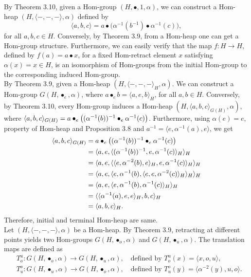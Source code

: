 \documentclass[14pt]{article}
\theoremstyle{Definition}
\theoremstyle{remark}
\begin{document}
By Theorem 3.10, given a Hom-group $(H, \bullet, 1, \alpha)$, we can construct a Hom-heap $(H, \langle -,-,- \rangle, \alpha)$ defined by
\[
\langle a,b,c\rangle = a \bullet \big(\alpha^{-1}(b^{-1}) \bullet \alpha^{-1}(c)\big),
\]
for all $a,b,c \in H$.
Conversely, by Theorem 3.9, from a Hom-heap one can get a Hom-group structure.
Furthermore, we can easily verify that the map $f : H \to H$, defined by $f(a) = a \bullet x$, for a fixed Hom-retract element $x$ satisfying $\alpha(x)=x \in H$, is an isomorphism of Hom-groups from the initial Hom-group to the corresponding induced Hom-group.\\
By Theorem 3.9, given a Hom-heap $(H,\langle-,-,-\rangle_{H},\alpha)$. We can construct a Hom-group $G(H,\bullet_{e},\alpha)$, where $a\bullet_{e}b=\langle a,e,b\rangle_{H}$, for all $a,b\in H$. Conversely, by Theorem 3.10, every Hom-group induces a Hom-heap $(H,\langle a,b,c\rangle_{G(H)},\alpha)$, where $\langle a,b,c\rangle_{G(H)}=a\bullet_{e}\big{(}(\alpha^{-1}(b))^{-1}\bullet_{e}\alpha^{-1}(c)\big{)}$. Furthermore, using $\alpha(e)=e$, property of Hom-heap and Proposition 3.8 and $a^{-1}=\langle e,\alpha^{-1}(a), e\rangle$, we get
\begin{align*}
\langle a,b,c\rangle_{G(H)}&=a\bullet_{e}\big{(}(\alpha^{-1}(b))^{-1}\bullet_{e}\alpha^{-1}(c)\big{)}\\
&=\langle a,e,\langle(\alpha^{-1}(b))^{-1},e,\alpha^{-1}(c)\rangle_{H}\rangle_{H}\\
&=\langle a,e,\langle\langle e,\alpha^{-2}(b),e\rangle_{H},e,\alpha^{-1}(c)\rangle_{H}\rangle_{H}\\
&=\langle a,e,\langle e,\alpha^{-1}(b),\langle e,e,\alpha^{-2}(c)\rangle_{H}\rangle_{H}\rangle_{H}\\
&=\langle a,e,\langle e,\alpha^{-1}(b),\alpha^{-1}(c)\rangle_{H}\rangle_{H}\\
&=\langle \langle \alpha^{-1}(a),e,e\rangle_{H},b,c\rangle_{H}\\
&=\langle a,b,c\rangle_{H}.
\end{align*}
Therefore, initial and terminal Hom-heap are same.\\
 Let $(H, \langle -, -, - \rangle, \alpha)$ be a Hom-heap. By Theorem 3.9, retracting at different points yields two Hom-groups $G(H, \bullet_o, \alpha)$ and $G(H, \bullet_u, \alpha)$. The translation maps are defined as
\begin{align*}
&T_o^u: G(H, \bullet_o, \alpha) \to G(H, \bullet_u, \alpha), \quad \text{defined by } T_o^u(x) = \langle x, o, u \rangle, \\
&T_u^o: G(H, \bullet_u, \alpha) \to G(H, \bullet_o, \alpha), \quad \text{defined by } T_u^o(y) = \langle \alpha^{-2}(y), u, o \rangle.
\end{align*}
\end{document}
